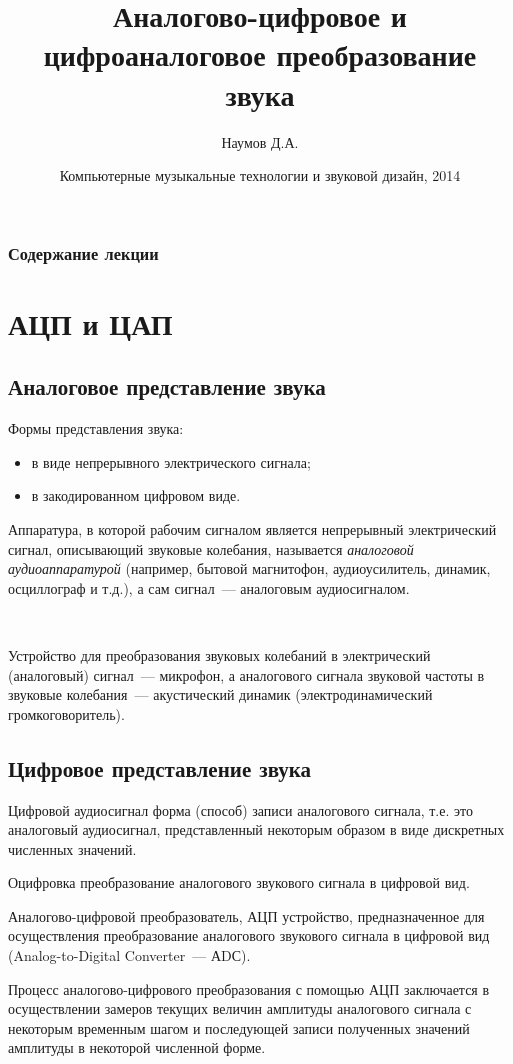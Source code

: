 \documentclass{beamer}
\title[Оцифровка]{Аналогово-цифровое и цифроаналоговое преобразование звука}
\author{Наумов Д.А.}
\date[24.02.2014] {Компьютерные музыкальные технологии и звуковой дизайн, 2014}
\begin{document}
\begin{frame}
  \titlepage
\end{frame}
  
\begin{frame}
  \frametitle{Содержание лекции}
  \tableofcontents  
\end{frame}
  
\section{АЦП и ЦАП}
\subsection{Аналоговое представление звука}
\begin{frame}

Формы представления звука:
\begin{itemize}
\item в виде непрерывного электрического сигнала;
\item в закодированном цифровом виде. 
\end{itemize}

Аппаратура, в которой рабочим сигналом является непрерывный электрический сигнал, описывающий звуковые колебания, называется {\itshape аналоговой аудиоаппаратурой} (например, бытовой магнитофон, аудиоусилитель, динамик, осциллограф и т.д.), а сам сигнал~--- аналоговым аудиосигналом.

~

Устройство для преобразования звуковых колебаний в электрический (аналоговый) сигнал~--- микрофон, а аналогового сигнала звуковой частоты в звуковые колебания~--- акустический динамик (электродинамический громкоговоритель). 
\end{frame}   

\subsection{Цифровое представление звука}
\begin{frame}
\begin{block}{Цифровой аудиосигнал}
форма (способ) записи аналогового сигнала, т.е. это аналоговый аудиосигнал, представленный некоторым образом в виде дискретных численных значений.
\end{block} 

\begin{block}{Оцифровка}
преобразование аналогового звукового сигнала в цифровой вид. 
\end{block}

\begin{block}{Аналогово-цифровой преобразователь, АЦП}
устройство, предназначенное для осуществления преобразование аналогового звукового сигнала в цифровой вид (Analog-to-Digital Converter~--- АDС). 
\end{block}

Процесс аналогово-цифрового преобразования с помощью АЦП заключается в осуществлении замеров текущих величин амплитуды аналогового сигнала с некоторым временным шагом и последующей записи полученных значений амплитуды в некоторой численной форме.
\end{frame}
\end{document}
